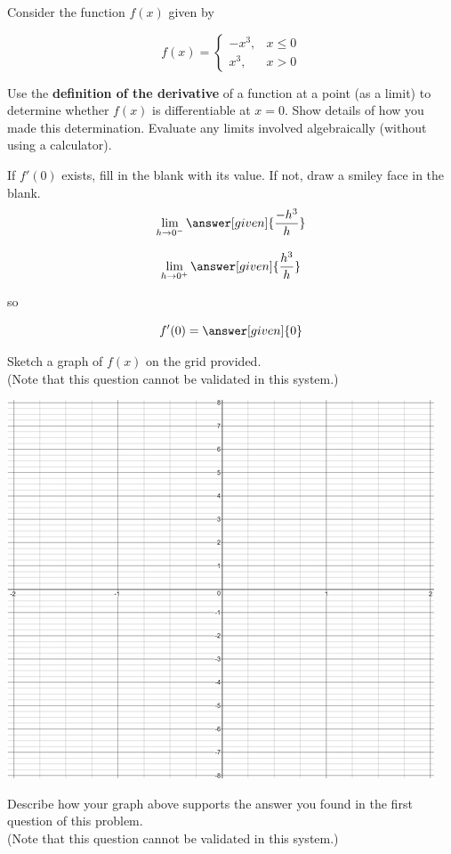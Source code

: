 \documentclass[handout]{ximera}
\begin{document}
\begin{problem}
Consider the function $f(x)$ given by

$$f(x) = \begin{cases} \displaystyle -x^3, & x \leq 0 \\ x^3, & x >0 \end{cases}$$

\begin{question}
Use the \textbf{definition of the derivative} of a function at a point (as a limit) to determine whether $f(x)$ is differentiable at $x=0$. Show details of how you made this determination. Evaluate any limits involved algebraically (without using a calculator).

If $f'(0)$ exists, fill in the blank with its value. If not, draw a smiley face in the blank. 
\[
\displaystyle \lim_{h\to 0^-} \answer[given]{\dfrac{-h^3}{h}}
\]

\[
\displaystyle \lim_{h\to 0^+} \answer[given]{\dfrac{h^3}{h}}
\]

so

\[
f'(0) = \answer[given]{0}
\]
\end{question}

\begin{question}
Sketch a graph of $f(x)$ on the grid provided. \\(Note that this question cannot be validated in this system.)

\includegraphics[scale=0.05]{2X8scaled.png}

\end{question}

\begin{question}
Describe how your graph above supports the answer you found in the first question of this problem. \\(Note that this question cannot be validated in this system.)
\begin{freeResponse}
\end{freeResponse}
\end{question}
\end{problem}
\end{document}
